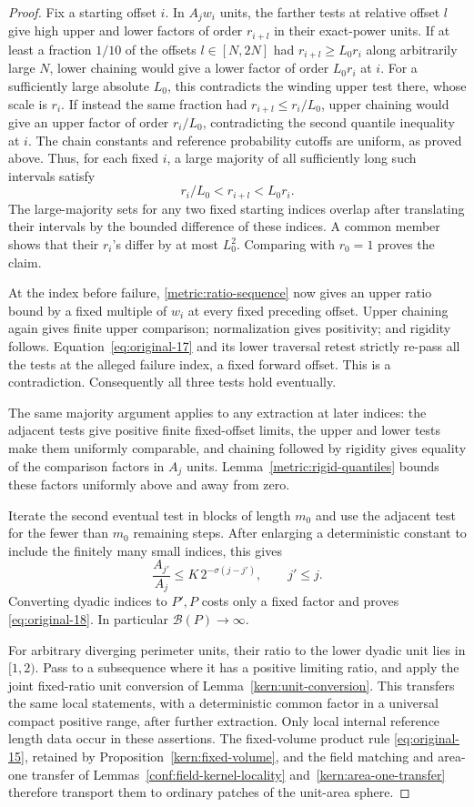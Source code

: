 \begin{proof}
Fix a starting offset $i$. In $A_jw_i$ units, the farther tests at relative
offset $l$ give high upper and lower factors of order $r_{i+l}$ in
their exact-power units. If at least a fraction $1/10$ of the offsets
$l\in[N,2N]$ had $r_{i+l}\ge L_0r_i$ along arbitrarily large $N$,
lower chaining would give a lower factor of order $L_0r_i$ at $i$.
For a sufficiently large absolute $L_0$, this contradicts the winding
upper test there, whose scale is $r_i$. If instead the same fraction
had $r_{i+l}\le r_i/L_0$, upper chaining would give an upper factor
of order $r_i/L_0$, contradicting the second quantile inequality at $i$.
The chain constants and reference probability cutoffs are uniform, as
proved above. Thus, for each fixed $i$, a large majority of all
sufficiently long such intervals satisfy
\[
 r_i/L_0<r_{i+l}<L_0r_i.
\]
The large-majority sets for any two fixed starting indices overlap
after translating their intervals by the bounded difference of these
indices. A common member shows that their $r_i$'s differ by at most
$L_0^2$. Comparing with $r_0=1$ proves the claim.

At the index before failure, \eqref{metric:ratio-sequence} now gives an
upper ratio bound by a fixed multiple of $w_i$ at every fixed preceding
offset. Upper chaining again gives finite upper comparison; normalization
gives positivity; and rigidity follows. Equation~\eqref{eq:original-17}
and its lower traversal retest strictly re-pass all the tests at the
alleged failure index, a fixed forward offset. This is a contradiction.
Consequently all three tests hold eventually.

The same majority argument applies to any extraction at later indices:
the adjacent tests give positive finite fixed-offset limits, the upper
and lower tests make them uniformly comparable, and chaining followed
by rigidity gives equality of the comparison factors in $A_j$ units.
Lemma~\ref{metric:rigid-quantiles} bounds these factors uniformly above
and away from zero.

Iterate the second eventual test in blocks of length $m_0$ and use
the adjacent test for the fewer than $m_0$ remaining steps. After
enlarging a deterministic constant to include the finitely many small
indices, this gives
\[
 \frac{A_{j'}}{A_j}\le K\,2^{-\sigma(j-j')},\qquad j'\le j.
\]
Converting dyadic indices to $P',P$ costs only a fixed factor and proves
\eqref{eq:original-18}. In particular $\mathcal B(P)\to\infty$.

For arbitrary diverging perimeter units, their ratio to the lower
dyadic unit lies in $[1,2)$. Pass to a subsequence where it has a
positive limiting ratio, and apply the joint fixed-ratio unit conversion
of Lemma~\ref{kern:unit-conversion}. This transfers the same local statements,
with a deterministic common factor in a universal compact positive
range, after further extraction. Only local internal reference length
data occur in these assertions. The fixed-volume product rule
\eqref{eq:original-15}, retained by Proposition~\ref{kern:fixed-volume},
and the field matching and area-one transfer of
Lemmas~\ref{conf:field-kernel-locality} and~\ref{kern:area-one-transfer}
therefore transport them to ordinary patches of the unit-area sphere.
\end{proof}

